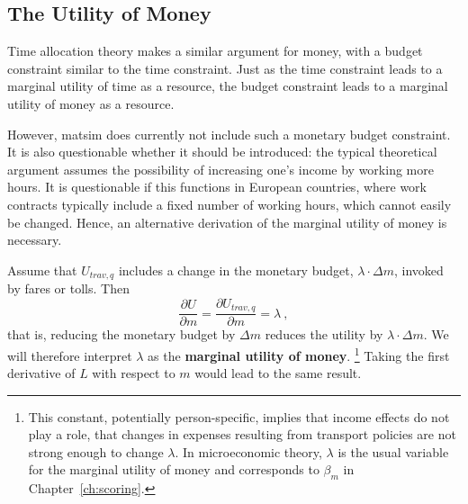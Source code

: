 \subsection{The Utility of Money}
\label{ch:economicEval:valuingBehavior:uom}
Time allocation theory \citep{DeSerpa1997economicsOfTime, Jara-DiazGuevara-2003} makes a similar argument for money, with a budget constraint similar to the time constraint.
%
Just as the time constraint leads to a marginal utility of time as a resource, the budget constraint leads to a marginal utility of money as a resource.

However, \acrshort{matsim} does currently not include such a monetary budget constraint. It is also questionable whether it should be introduced: the typical theoretical argument assumes the possibility of increasing one's income by working more hours. It is questionable if this functions in European countries, where work contracts typically include a fixed number of working hours, which cannot easily be changed.  
%
Hence, an alternative derivation of the marginal utility of money is necessary.

Assume that $U_{trav,q}$ includes a change in the monetary budget, $\lambda \cdot \Delta m$, \eg invoked by fares or tolls.  Then
\begin{equation}
%
\frac{\partial U}{\partial m} 
%
= \frac{\partial U_{trav,q}}{\partial m}
%
= \lambda \ ,
\label{eq:marg-utl-of-money}
\end{equation}
that is, reducing the monetary budget by $\Delta m$ reduces the utility by $ \lambda \cdot \Delta m$.
%
We will therefore interpret $\lambda$ as the \textbf{marginal utility of money}.%
%
\footnote{\label{footnote:income-effects}%
%
This constant, potentially person-specific, implies that income effects \citep{HerrigesKling1999Nonlinearincomeeffects,DalyEtAl2008WelfareMeasuresIncome, DagsvikKarlstrom2005ChoiceProbabilitiesInNonlinearRUM,Jara-Diaz1989IncomeEffectsInModeChoice} do not play a role, \ie that changes in expenses resulting from transport policies are not strong enough to change $\lambda$. In microeconomic theory, $\lambda$ is the usual variable for the marginal utility of money and corresponds to $\beta_{m}$ in Chapter~\ref{ch:scoring}.
%
}
%
Taking the first derivative of $L$ with respect to $m$ would lead to the same result.

